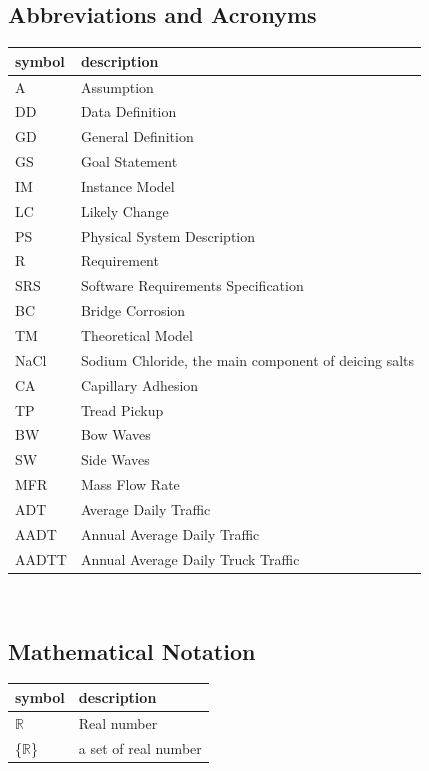 \documentclass[12pt]{article}
\begin{document}
\subsection{Abbreviations and Acronyms}

\renewcommand{\arraystretch}{1.2}
\begin{tabular}{l l} 
  \toprule		
  \textbf{symbol} & \textbf{description}\\
  \midrule 
  A & Assumption\\
  DD & Data Definition\\
  GD & General Definition\\
  GS & Goal Statement\\
  IM & Instance Model\\
  LC & Likely Change\\
  PS & Physical System Description\\
  R & Requirement\\
  SRS & Software Requirements Specification\\
  BC & Bridge Corrosion\\
  TM & Theoretical Model\\
  NaCl & Sodium Chloride, the main component of deicing salts \\
  CA & Capillary Adhesion \\
  TP & Tread Pickup\\
  BW & Bow Waves\\
  SW & Side Waves\\
  MFR & Mass Flow Rate\\
  ADT & Average Daily Traffic\\
  AADT & Annual Average Daily Traffic\\
  AADTT & Annual Average Daily Truck Traffic \\
  \bottomrule
\end{tabular}\\

\subsection{Mathematical Notation}
\renewcommand{\arraystretch}{1.2}
\begin{tabular}{l l} 
  \toprule		
  \textbf{symbol} & \textbf{description}\\
  \midrule 
  $\mathbb{R}$ & Real number \\
  \{$\mathbb{R}$\} & a set of real number\\
  \bottomrule
\end{tabular}\\
\end{document}
